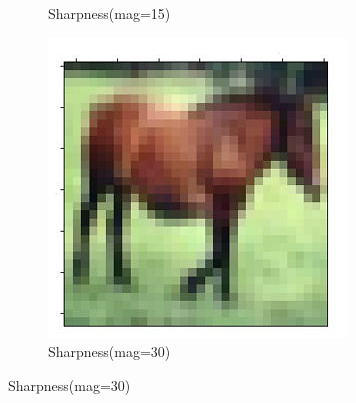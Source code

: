 \documentclass[onecolumn]{ujarticle}   %
\begin{document}
\begin{figure}[h]
\begin{subfigure}{0.3\columnwidth}
        \caption{Sharpness(mag=15)}
        \label{fig:Sharpness_15}
      \end{subfigure}
      \begin{subfigure}{0.3\columnwidth}
        \centering
        \includegraphics[width=1.0\columnwidth]{transform_test/Sharpness_30.png}
        \caption{Sharpness(mag=30)}
        \label{fig:Sharpness_30}
      \end{subfigure}


\end{figure}
\end{document}

